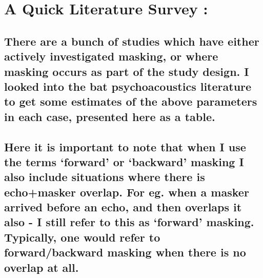 \documentclass[11pt]{article}
\begin{document}
    \hypertarget{a-quick-literature-survey}{%
\section{A Quick Literature Survey :}\label{a-quick-literature-survey}}

\hypertarget{there-are-a-bunch-of-studies-which-have-either-actively-investigated-masking-or-where-masking-occurs-as-part-of-the-study-design.-i-looked-into-the-bat-psychoacoustics-literature-to-get-some-estimates-of-the-above-parameters-in-each-case-presented-here-as-a-table.}{%
\subsection{There are a bunch of studies which have either actively
investigated masking, or where masking occurs as part of the study
design. I looked into the bat psychoacoustics literature to get some
estimates of the above parameters in each case, presented here as a
table.}\label{there-are-a-bunch-of-studies-which-have-either-actively-investigated-masking-or-where-masking-occurs-as-part-of-the-study-design.-i-looked-into-the-bat-psychoacoustics-literature-to-get-some-estimates-of-the-above-parameters-in-each-case-presented-here-as-a-table.}}

\hypertarget{here-it-is-important-to-note-that-when-i-use-the-terms-forward-or-backward-masking-i-also-include-situations-where-there-is-echomasker-overlap.-for-eg.-when-a-masker-arrived-before-an-echo-and-then-overlaps-it-also---i-still-refer-to-this-as-forward-masking.-typically-one-would-refer-to-forwardbackward-masking-when-there-is-no-overlap-at-all.}{%
\subsection{Here it is important to note that when I use the terms
`forward' or `backward' masking I also include situations where there is
echo+masker overlap. For eg. when a masker arrived before an echo, and
then overlaps it also - I still refer to this as `forward' masking.
Typically, one would refer to forward/backward masking when there is no
overlap at
all.}\label{here-it-is-important-to-note-that-when-i-use-the-terms-forward-or-backward-masking-i-also-include-situations-where-there-is-echomasker-overlap.-for-eg.-when-a-masker-arrived-before-an-echo-and-then-overlaps-it-also---i-still-refer-to-this-as-forward-masking.-typically-one-would-refer-to-forwardbackward-masking-when-there-is-no-overlap-at-all.}}
\end{document}
